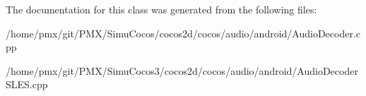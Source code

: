 The documentation for this class was generated from the following files\+:\begin{DoxyCompactItemize}
\item 
/home/pmx/git/\+P\+M\+X/\+Simu\+Cocos/cocos2d/cocos/audio/android/Audio\+Decoder.\+cpp\item 
/home/pmx/git/\+P\+M\+X/\+Simu\+Cocos3/cocos2d/cocos/audio/android/Audio\+Decoder\+S\+L\+E\+S.\+cpp\end{DoxyCompactItemize}
